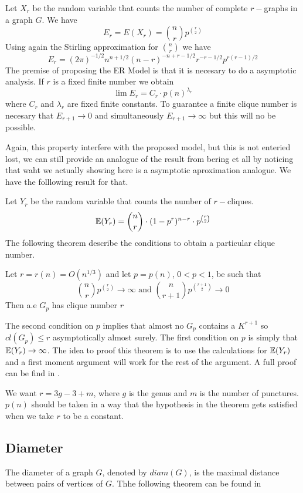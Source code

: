Let $X_r$ be the random variable that counts the number of complete $r-$graphs in a graph $G$. We have
$$E_{r} = E(X_r) = \binom{n}{r}p^{\binom{r}{2}}$$
Using again the Stirling approximation for $\binom{n}{r}$ we have
$$E_{r} = (2\pi)^{- 1/2} n^{n+ 1/2} (n - r)^{-n+r-1/2} r^{-r-1/2} p^{r(r- 1)/2}$$
The premise of proposing the ER Model is that it is necesary to do a asymptotic analysis. If $r$ is a fixed finite number we obtain
$$\lim E_{r} = C_{r} \cdot p(n)^{\lambda_{r}}$$
where $C_{r}$ and $\lambda_{r}$ are fixed finite constants. To guarantee a finite clique number is necesary that $E_{r+1} \to 0$ and simultaneously $E_{r+1} \to \infty$ but this will no be possible.

Again, this property interfere with the proposed model, but this is not enteried lost, we can still provide an analogue of the result from bering et all by noticing that waht we actually showing here is a asymptotic aproximation analogue.
We have the folllowing result for that.

Let $Y_{r}$ be the random variable that counts the number of $r-$cliques.
$$\mathbb{E}(Y_{r}) = \binom{n}{r} \cdot (1-p^{r})^{n-r} \cdot p^{\binom{r}{2}}  $$
The following theorem describe the conditions to obtain a particular clique number.

\begin{theorem}
Let $r = r(n) = O(n^{1/3})$ and let $p=p(n)$, $0<p<1$, be such that
$$\binom{n}{r} p^{\binom{r}{2}} \to \infty \text{ and } \binom{n}{r+1} p^{\binom{r+1}{2}} \to 0 $$
Then a.e $G_{p}$ has clique number $r$
\end{theorem}
The second condition on $p$ implies that almost no $G_{p}$ contains a $K^{r+1}$ so $cl(G_{p})\leq r$ asymptotically almost surely. The first condition on $p$ is simply that $\mathbb{E} (Y_{r}) \to  \infty$. The idea to proof this theorem is to use the calculations for $\mathbb{E}(Y_{r})$ and a first moment argument will work for the rest of the argument. A full proof can be find in \cite[Bollobás, p.290]{Bollobas}.

We want $r = 3g-3+m$, where $g$ is the genus and $m$ is the number of punctures. $p(n)$ should be taken in a way that the hypothesis in the theorem gets satisfied when we take $r$ to be a constant.


\subsection{Diameter}

The diameter of a graph $G$, denoted by $diam(G)$, is the maximal distance between pairs of vertices of $G$. Thhe following theorem can be found in \cite[Bollobás, p.259]{Bollobas}




